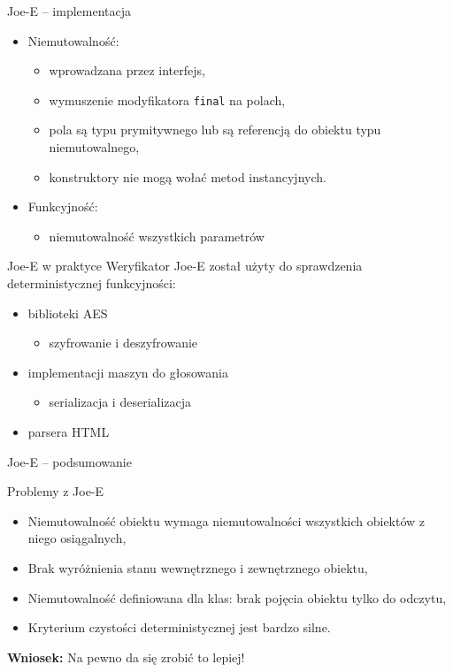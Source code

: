 \documentclass{beamer}
\begin{document}
\begin{frame}{Joe-E -- implementacja}
  \begin{itemize}
  \item Niemutowalność:
    \begin{itemize}
    \item wprowadzana przez interfejs, 
    \item wymuszenie modyfikatora \texttt{final} na polach, 
    \item pola są typu prymitywnego lub są referencją do 
      obiektu typu niemutowalnego, 
    \item konstruktory nie mogą wołać metod instancyjnych. 
  \end{itemize}
  \item Funkcyjność:
    \begin{itemize}
      \item niemutowalność wszystkich parametrów
    \end{itemize}
  \end{itemize}
\end{frame}

\begin{frame}{Joe-E w praktyce}
  Weryfikator Joe-E został użyty do sprawdzenia deterministycznej
  funkcyjności:
  \begin{itemize}
  \item<1-> biblioteki AES
    \begin{itemize}
      \item szyfrowanie i deszyfrowanie
    \end{itemize}
  \item<2-> implementacji maszyn do głosowania 
    \begin{itemize}
      \item serializacja i deserializacja
    \end{itemize}
  \item<3-> parsera HTML
  \end{itemize}
\end{frame}

\begin{frame}{Joe-E -- podsumowanie}
  \begin{alertblock}{Problemy z Joe-E}
    \begin{itemize} 
    \item<1-> Niemutowalność obiektu wymaga niemutowalności wszystkich
      obiektów z niego osiągalnych, 
    \item<1-> Brak wyróżnienia stanu wewnętrznego i zewnętrznego obiektu, 
    \item<2-> Niemutowalność definiowana dla klas: brak pojęcia obiektu
      tylko do odczytu, 
    \item<3-> Kryterium czystości deterministycznej jest bardzo silne. 
    \end{itemize}
  \end{alertblock}
  \pause
  \begin{beamerboxesrounded}[upper=gr, lower=lgr, shadow=true]{\bf Wniosek:}
    Na pewno da się zrobić to lepiej!
  \end{beamerboxesrounded}
\end{frame}
\end{document}
